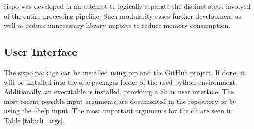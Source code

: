 \gls{sispo} was developed in an attempt to logically separate the distinct steps involved of the entire processing pipeline. Such modularity eases further development as well as reduce unnecessary library imports to reduce memory consumption.

\subsection{User Interface}
The \gls{sispo} package can be installed using pip and the GitHub project. If done, it will be installed into the site-packages folder of the used python environment. Additionally, an executable is installed, providing a \gls{cli} as user interface. The most recent possible input arguments are documented in the repository or by using the --help input. The most important arguments for the \gls{cli} are seen in Table \ref{tab:cli_args}.

